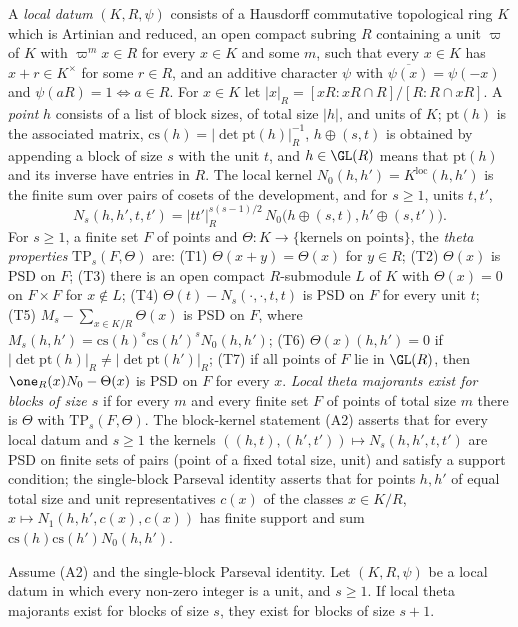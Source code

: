A \emph{local datum} $(K,R,\psi)$ consists of a Hausdorff commutative topological ring $K$ which is Artinian and reduced, an open
compact subring $R$ containing a unit $\varpi$ of $K$ with $\varpi^mx\in R$ for every $x\in K$ and some $m$, such that every
$x\in K$ has $x+r\in K^\times$ for some $r\in R$, and an additive character $\psi$ with $\overline{\psi(x)}=\psi(-x)$ and
$\psi(aR)=1\iff a\in R$. For $x\in K$ let $|x|_R=[xR:xR\cap R]/[R:R\cap xR]$. A \emph{point} $h$ consists of a list of block
sizes, of total size $|h|$, and units of $K$; $\mathrm{pt}(h)$ is the associated matrix, $\mathrm{cs}(h)=|\det\mathrm{pt}(h)|_R^{-1}$,
$h\oplus(s,t)$ is obtained by appending a block of size $s$ with the unit $t$, and $h\in\GL(R)$ means that $\mathrm{pt}(h)$ and its
inverse have entries in $R$. The local kernel $N_0(h,h')=K^{\mathrm{loc}}(h,h')$ is the finite sum over pairs of cosets of the
development, and for $s\ge1$, units $t,t'$,
\[
N_s(h,h',t,t')=|tt'|_R^{s(s-1)/2}\,N_0\bigl(h\oplus(s,t),h'\oplus(s,t')\bigr).
\]
For $s\ge1$, a finite set $F$ of points and $\Theta\colon K\to\{\text{kernels on points}\}$, the \emph{theta properties}
$\mathrm{TP}_s(F,\Theta)$ are:
(T1) $\Theta(x+y)=\Theta(x)$ for $y\in R$;
(T2) $\Theta(x)$ is PSD on $F$;
(T3) there is an open compact $R$-submodule $L$ of $K$ with $\Theta(x)=0$ on $F\times F$ for $x\notin L$;
(T4) $\Theta(t)-N_s(\cdot,\cdot,t,t)$ is PSD on $F$ for every unit $t$;
(T5) $M_s-\sum_{x\in K/R}\Theta(x)$ is PSD on $F$, where $M_s(h,h')=\mathrm{cs}(h)^s\mathrm{cs}(h')^sN_0(h,h')$;
(T6) $\Theta(x)(h,h')=0$ if $|\det\mathrm{pt}(h)|_R\ne|\det\mathrm{pt}(h')|_R$;
(T7) if all points of $F$ lie in $\GL(R)$, then $\one_R(x)N_0-\Theta(x)$ is PSD on $F$ for every $x$.
\emph{Local theta majorants exist for blocks of size $s$} if for every $m$ and every finite set $F$ of points of total size $m$
there is $\Theta$ with $\mathrm{TP}_s(F,\Theta)$. The block-kernel statement (A2) asserts that for every local datum and $s\ge1$
the kernels $((h,t),(h',t'))\mapsto N_s(h,h',t,t')$ are PSD on finite sets of pairs (point of a fixed total size, unit) and
satisfy a support condition; the single-block Parseval identity asserts that for points $h,h'$ of equal total size and unit
representatives $c(x)$ of the classes $x\in K/R$, $x\mapsto N_1(h,h',c(x),c(x))$ has finite support and sum
$\mathrm{cs}(h)\mathrm{cs}(h')N_0(h,h')$.

\begin{theorem}\label{pf:thmS:thetastep}
Assume (A2) and the single-block Parseval identity. Let $(K,R,\psi)$ be a local datum in which every non-zero integer is a unit,
and $s\ge1$. If local theta majorants exist for blocks of size $s$, they exist for blocks of size $s+1$.
\end{theorem}

